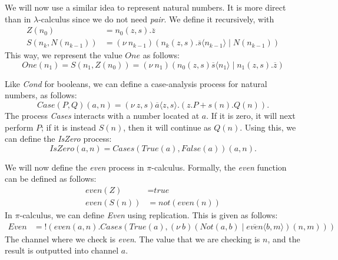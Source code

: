 \documentclass[a4paper, openany]{memoir}
\theoremstyle{definition}
\begin{document}
    We will now use a similar idea to represent natural numbers. It is more direct than in $\lambda$-calculus since we do not need \textit{pair}. We define it recursively, with
    \begin{align*}
        Z(n_0) &= n_0(z, s).\overline{z} \\
        S(n_k, N(n_{k-1})) &= (\nu \ n_{k-1})(n_k(z, s).\overline{s} \langle n_{k-1} \rangle \mid N(n_{k-1}))
    \end{align*}
    This way, we represent the value $\textit{One}$ as follows:
    \[\textit{One}(n_1) = S(n_1, Z(n_0)) = (\nu \ n_1)(n_0(z, s) \overline{s} \langle n_1 \rangle \mid n_1(z, s).\overline{z})\]
    
    Like \textit{Cond} for booleans, we can define a case-analysis process for natural numbers, as follows:
    \[\textit{Case}(P, Q)(a, n) = (\nu \ z, s)\overline{a} \langle z, s \rangle.(z.P + s(n).Q(n)).\]
    The process \textit{Cases} interacts with a number located at $a$. If it is zero, it will next perform $P$; if it is instead $S(n)$, then it will continue as $Q(n)$. Using this, we can define the \textit{IsZero} process:
    \[\textit{IsZero}(a, n) = \textit{Cases}(\textit{True}(a), \textit{False}(a))(a, n).\]

    We will now define the \textit{even} process in $\pi$-calculus. Formally, the \textit{even} function can be defined as follows:
    \begin{align*}
        \textit{even}(Z) &= \textit{true} \\
        \textit{even}(S(n)) &= \textit{not}(\textit{even}(n))
    \end{align*}
    In $\pi$-calculus, we can define \textit{Even} using replication. This is given as follows:
    \begin{align*}
        \textit{Even} &= !(\textit{even}(a, n).\textit{Cases}(\textit{True}(a), 
            (\nu \ b)(\textit{Not}(a, b) \mid \overline{\textit{even}} \langle b, m \rangle)(n, m)
        ))
    \end{align*}
    The channel where we check is \textit{even}. The value that we are checking is $n$, and the result is outputted into channel $a$.
\end{document}
